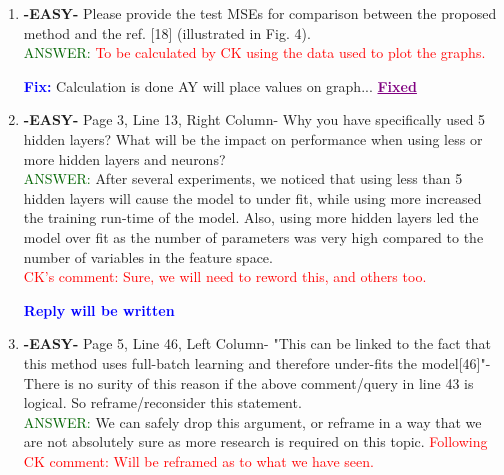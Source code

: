 \documentclass{article}
\newcommand{\fix}{\large \textcolor{blue}{ \textbf{Fix:} }}
\newcommand{\fixed}{\Large \textcolor{purple}{ \underline{\textbf{Fixed}} }}
\newcommand{\reply}{\large \textcolor{blue}{ \textbf{Reply will be written} }}
\begin{document}
\begin{enumerate}
\fix The names should be checked ... \fixed

\reply regarding the validation curves if we do not have space.


\item \textbf{-EASY-} Please provide the test MSEs for comparison between the proposed method and the ref. [18] (illustrated in Fig. 4).   \\
\textcolor{darkgreen}{ANSWER: }  \textcolor{red}{To be calculated by CK using the data used to plot the graphs.}

\fix Calculation is done AY will place values on graph... \fixed
    
    \item \textbf{-EASY-} Page 3, Line 13, Right Column- Why you have specifically used 5 hidden layers? What will be the impact on performance when using less or more hidden layers and neurons?\\
    \textcolor{darkgreen}{ANSWER: } After several experiments, we noticed that using less than 5 hidden layers will cause the model to under fit, while using more increased the training run-time of the model. Also, using more hidden layers led the model over fit as the number of parameters was very high compared to the number of variables in the feature space.  \\ \textcolor{red}{ CK's comment: Sure, we will need to reword this, and others too.}
    
    \reply

   
	\item \textbf{-EASY-} Page 5, Line 46, Left Column- "This can be linked to the fact that this method uses full-batch learning and therefore under-fits the model[46]"- There is no surity of this reason if the above comment/query in line 43 is logical. So reframe/reconsider this statement. \\
	
	\textcolor{darkgreen}{ANSWER: } We can safely drop this argument, or reframe in a way that we are not absolutely sure as more research is required on this topic. \textcolor{red}{Following CK comment: Will be reframed as to what we have seen.}


\end{enumerate}
\end{document}
